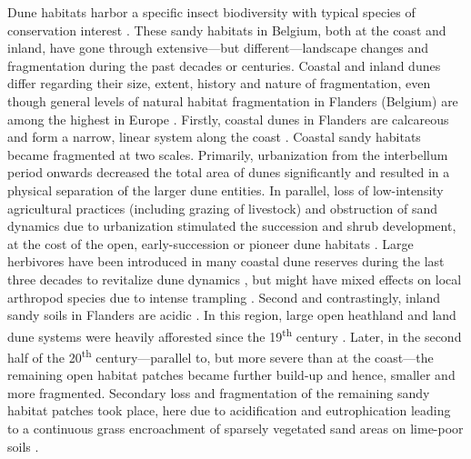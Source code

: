 \documentclass[10pt, twoside]{book} %
\begin{document}
	Dune habitats harbor a specific insect biodiversity with typical species of conservation interest \citep{maes2006, provoost2011, dero2021}. These sandy habitats in Belgium, both at the coast and inland, have gone through extensive---but different---landscape changes and fragmentation during the past decades or centuries. Coastal and inland dunes differ regarding their size, extent, history and nature of fragmentation, even though general levels of natural habitat fragmentation in Flanders (Belgium) are among the highest in Europe \citep{europeanenvironmentagency2011}. Firstly, coastal dunes in Flanders are calcareous and form a narrow, linear system along the coast \citep{provoost2004, decleer2007}. Coastal sandy habitats became fragmented at two scales. Primarily, urbanization from the interbellum period onwards decreased the total area of dunes significantly and resulted in a physical separation of the larger dune entities. In parallel, loss of low-intensity agricultural practices (including grazing of livestock) and obstruction of sand dynamics due to urbanization stimulated the succession and shrub development, at the cost of the open, early-succession or pioneer dune habitats \citep{provoost2011}. Large herbivores have been introduced in many coastal dune reserves during the last three decades to revitalize dune dynamics \citep{provoost2004}, but might have mixed effects on local arthropod species due to intense trampling \citep[chapter \ref{chapter3}]{bonte2008, vanklink2015, batsleer2022a}. Second and contrastingly, inland sandy soils in Flanders are acidic \citep{decleer2007}. In this region, large open heathland and land dune systems were heavily afforested since the 19\textsuperscript{th} century \citep{dekeersmaeker2015}. Later, in the second half of the 20\textsuperscript{th} century---parallel to, but more severe than at the coast---the remaining open habitat patches became further build-up and hence, smaller and more fragmented. Secondary loss and fragmentation of the remaining sandy habitat patches took place, here due to acidification and eutrophication leading to a continuous grass encroachment of sparsely vegetated sand areas on lime-poor soils \citep{schneiders2020}.\\
	
\end{document}
